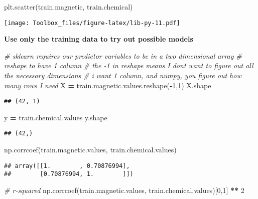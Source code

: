\documentclass[
]{book}
\newenvironment{Shaded}{\begin{snugshade}}{\end{snugshade}}
\newcommand{\CommentTok}[1]{\textcolor[rgb]{0.56,0.35,0.01}{\textit{#1}}}
\newcommand{\DecValTok}[1]{\textcolor[rgb]{0.00,0.00,0.81}{#1}}
\newcommand{\NormalTok}[1]{#1}
\newcommand{\OperatorTok}[1]{\textcolor[rgb]{0.81,0.36,0.00}{\textbf{#1}}}
\begin{document}
\begin{Shaded}
\begin{Highlighting}[]
\NormalTok{plt.scatter(train.magnetic, train.chemical)}
\end{Highlighting}
\end{Shaded}

\texttt{[image: Toolbox\_files/figure-latex/lib-py-11.pdf]}

\textbf{Use only the training data to try out possible models}

\begin{Shaded}
\begin{Highlighting}[]
\CommentTok{\# sklearn requires our predictor variables to be in a two dimensional array}
\CommentTok{\# reshape to have 1 column}
\CommentTok{\# the {-}1 in reshape means I don\textquotesingle{}t want to figure out all the necessary dimensions}
\CommentTok{\# i want 1 column, and numpy, you figure out how many rows I need}
\NormalTok{X }\OperatorTok{=}\NormalTok{ train.magnetic.values.reshape(}\OperatorTok{{-}}\DecValTok{1}\NormalTok{,}\DecValTok{1}\NormalTok{)}
\NormalTok{X.shape}
\end{Highlighting}
\end{Shaded}

\begin{verbatim}
## (42, 1)
\end{verbatim}

\begin{Shaded}
\begin{Highlighting}[]
\NormalTok{y }\OperatorTok{=}\NormalTok{ train.chemical.values}
\NormalTok{y.shape}
\end{Highlighting}
\end{Shaded}

\begin{verbatim}
## (42,)
\end{verbatim}

\begin{Shaded}
\begin{Highlighting}[]
\NormalTok{np.corrcoef(train.magnetic.values, train.chemical.values)}
\end{Highlighting}
\end{Shaded}

\begin{verbatim}
## array([[1.        , 0.70876994],
##        [0.70876994, 1.        ]])
\end{verbatim}

\begin{Shaded}
\begin{Highlighting}[]
\CommentTok{\# r{-}squared}
\NormalTok{np.corrcoef(train.magnetic.values, train.chemical.values)[}\DecValTok{0}\NormalTok{,}\DecValTok{1}\NormalTok{] }\OperatorTok{**} \DecValTok{2}
\end{Highlighting}
\end{Shaded}
\end{document}
